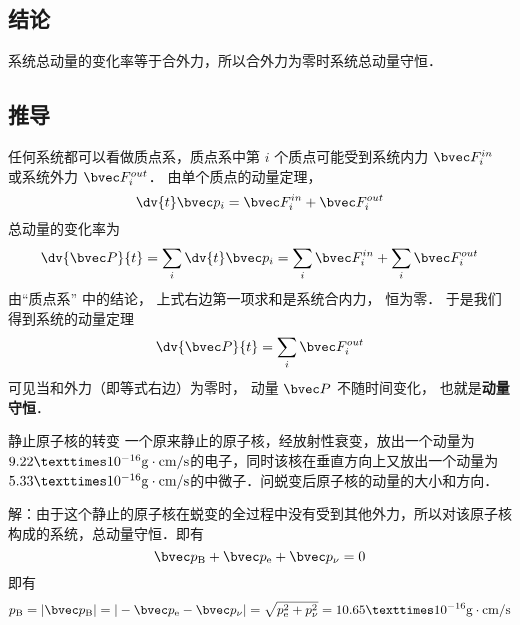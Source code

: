 \subsection{结论}
系统总动量的变化率等于合外力，所以合外力为零时系统总动量守恒．

\subsection{推导}
任何系统都可以看做质点系，质点系中第 $i$ 个质点可能受到系统内力 $\bvec F_i^{in}$ 或系统外力 $\bvec F_i^{out}$． 由单个质点的动量定理，
\begin{equation}
\dv{t} \bvec p_i = \bvec F_i^{in} + \bvec F_i^{out}
\end{equation}
总动量的变化率为
\begin{equation}
\dv{\bvec P}{t} = \sum_i \dv{t} \bvec p_i  = \sum_i \bvec F_i^{in}  + \sum_i \bvec F_i^{out}
\end{equation}
由“质点系” 中的结论， 上式右边第一项求和是系统合内力， 恒为零． 于是我们得到系统的动量定理
\begin{equation}
\dv{\bvec P}{t} = \sum_i \bvec F_i^{out}
\end{equation}
可见当和外力（即等式右边）为零时， 动量 $\bvec P$ 不随时间变化， 也就是\textbf{动量守恒}．

\begin{example}{静止原子核的转变}
一个原来静止的原子核，经放射性衰变，放出一个动量为$9.22×10^{-16}{\rm g\cdot cm/s}$的电子，同时该核在垂直方向上又放出一个动量为$5.33×10^{-16}{\rm g\cdot cm/s}$的中微子．问蜕变后原子核的动量的大小和方向．

解：由于这个静止的原子核在蜕变的全过程中没有受到其他外力，所以对该原子核构成的系统，总动量守恒．即有
$$\bvec p_{\rm B}+\bvec p_{\rm e}+\bvec p_{\rm \nu}=0$$
即有
$$p_{\rm B}=|\bvec p_{\rm B}|=|-\bvec p_{\rm e}-\bvec p_{\rm \nu}|=\sqrt{p_{\rm e}^{2}+p_{\rm \nu}^{2}}=10.65×10^{-16}{\rm g\cdot cm/s}$$
\end{example}
